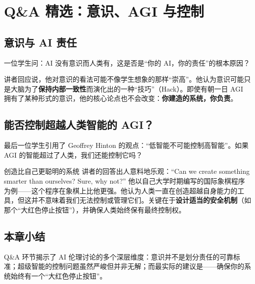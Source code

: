 \section{Q\&A 精选：意识、AGI 与控制}

\subsection{意识与 AI 责任}

一位学生问：AI 没有意识而人类有，这是否是``你的 AI，你的责任''的根本原因？

讲者回应说，他对意识的看法可能不像学生想象的那样``崇高''。他认为意识可能只是大脑为了\textbf{保持内部一致性}而演化出的一种``技巧''（Hack）。即使有朝一日 AGI 拥有了某种形式的意识，他的核心论点也不会改变：\textbf{你建造的系统，你负责}。

\subsection{能否控制超越人类智能的 AGI？}

最后一位学生引用了 Geoffrey Hinton 的观点：``低智能不可能控制高智能''。如果 AGI 的智能超过了人类，我们还能控制它吗？

\begin{knowledgebox}{创造比自己更聪明的系统}
讲者的回答出人意料地乐观：``Can we create something smarter than ourselves? Sure, why not?'' 他以自己大学时期编写的国际象棋程序为例——这个程序在象棋上比他更强。他认为人类一直在创造超越自身能力的工具，但这并不意味着我们无法控制或管理它们。关键在于\textbf{设计适当的安全机制}（如那个``大红色停止按钮''），并确保人类始终保有最终控制权。
\end{knowledgebox}

\subsection{本章小结}

Q\&A 环节揭示了 AI 伦理讨论的多个深层维度：意识并不是划分责任的可靠标准；超级智能的控制问题虽然严峻但并非无解；而最实际的建议是——确保你的系统始终有一个``大红色停止按钮''。

